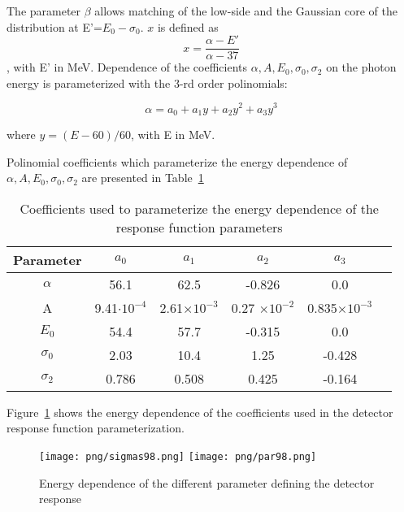 The parameter $\beta$  allows matching of the low-side and the Gaussian core
of the distribution at E'=$E_0-\sigma_0$.
$x$ is defined as
$$
  x= \frac{\alpha- E'}{\alpha -37} 
$$, with E' in MeV.
Dependence of the coefficients $\alpha, A, E_0, \sigma_0, \sigma_2$ on the photon energy
is parameterized with the 3-rd order polinomials:

\begin{equation}
  \alpha= a_0+a_1y+a_2y^2+a_3y^3
\end{equation}

where $y= (E-60)/60$, with E in MeV.

Polinomial coefficients which parameterize the energy dependence of
$\alpha, A, E_0, \sigma_0, \sigma_2$ are presented in Table~\ref{tab:param98}

\begin{table}[!h] \label{tab:param98}
  \begin{center}
    \begin{tabular}{| c | c | c | c | c | c | }
      \hline
      Parameter  & $a_0$              & $a_1$ & $a_2$ & $a_3$ \\ \hline
      $\alpha$   & 56.1               &62.5 & -0.826 & 0.0  \\ \hline
      A          & 9.41$\cdot 10^{-4}$ & 2.61$\times 10^{-3}$ &0.27 $\times 10^{-2}$ &0.835$\times 10^{-3}$   \\ \hline
      $E_0$      & 54.4               & 57.7 & -0.315 &0.0 \\ \hline
      $\sigma_0$ & 2.03               &10.4 &1.25 & -0.428\\ \hline
      $\sigma_2$ & 0.786              & 0.508 & 0.425 & -0.164\\ \hline
    \end{tabular}
  \end{center}
  \caption{Coefficients used to parameterize the energy dependence of the response function parameters}
\end{table}

Figure~\ref{fig:parameters98} shows the energy dependence of the coefficients used
in the detector response function parameterization.

\begin{figure}[!h]
  \begin{center}
    \texttt{[image: png/sigmas98.png]} 
    \texttt{[image: png/par98.png]} 
  \end{center}
  \caption{Energy dependence of the different parameter defining the detector response}
  \label{fig:parameters98}
\end{figure}

